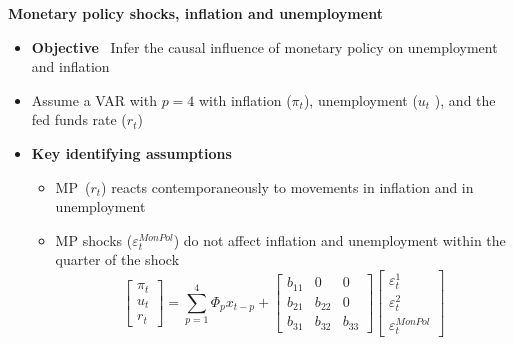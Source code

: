 \documentclass[10pt,english,t,aspectratio=169,ignorenonframetext]{beamer}
\begin{document}
\begin{frame}
{\textbf{Monetary policy shocks, inflation and unemployment}}\bigskip\bigskip

\begin{itemize}
\item \textbf{Objective} \ Infer the causal influence of monetary policy on
unemployment and inflation\bigskip\pause

\item Assume a VAR with $p=4$ with inflation ($\pi_t$), unemployment ($u_t$%
), and the fed funds rate ($r_t$)\bigskip

\item \textbf{Key identifying assumptions}\smallskip

\begin{itemize}
\item MP\ ($r_{t}$) reacts contemporaneously to movements in inflation and
in unemployment\medskip

\item MP shocks ($\varepsilon^{MonPol}_{t}$) do not affect inflation and
unemployment within the quarter of the shock\smallskip \pause%
\begin{equation*}
\begin{bmatrix}
\pi _{t} \\ 
u_{t} \\ 
r_{t}%
\end{bmatrix}%
=\sum_{p=1}^4 \Phi_p x_{t-p} +\left[ 
\begin{array}{ccc}
b_{11} & 0 & 0 \\ 
b_{21} & b_{22} & 0 \\ 
b_{31} & b_{32} & b_{33}%
\end{array}%
\right] 
\begin{bmatrix}
\varepsilon^{1}_{t} \\ 
\varepsilon^{2}_{t} \\ 
\varepsilon^{MonPol}_{t}%
\end{bmatrix}%
\end{equation*}
\end{itemize}
\end{itemize}
\end{frame}

\end{document}

